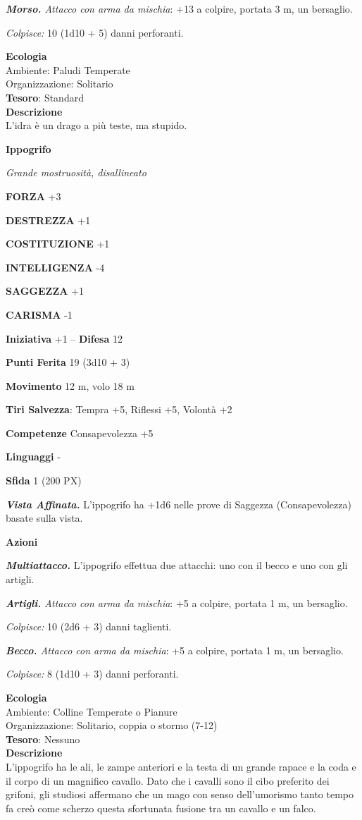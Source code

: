 \begin{multicols}{2}
\textit{\textbf{Morso.} Attacco con arma da mischia}: +13 a colpire, portata 3 m, un bersaglio.

\textit{Colpisce:} 10 (1d10 + 5) danni perforanti.

\textbf{Ecologia}\\
Ambiente: Paludi Temperate\\
Organizzazione: Solitario\\
\textbf{Tesoro}: Standard\\
\textbf{Descrizione}\\
L'idra è un drago a più teste, ma stupido.


\medskip{}\textbf{Ippogrifo}

\textit{Grande mostruosità, disallineato}

\textbf{FORZA} +3

\textbf{DESTREZZA} +1

\textbf{COSTITUZIONE} +1

\textbf{INTELLIGENZA} -4

\textbf{SAGGEZZA} +1

\textbf{CARISMA} -1

\textbf{Iniziativa} +1 -- \textbf{Difesa} 12

\textbf{Punti Ferita} 19 (3d10 + 3)

\textbf{Movimento} 12 m, volo 18 m

\textbf{Tiri Salvezza}: Tempra +5, Riflessi +5, Volontà +2

\textbf{Competenze} Consapevolezza +5

\textbf{Linguaggi} -

\textbf{Sfida} 1 (200 PX)

\textit{\textbf{Vista Affinata.}} L'ippogrifo ha +1d6 nelle prove di Saggezza (Consapevolezza) basate sulla vista.

\textbf{Azioni}

\textit{\textbf{Multiattacco.}} L'ippogrifo effettua due attacchi: uno con il becco e uno con gli artigli.

\textit{\textbf{Artigli.} Attacco con arma da mischia}: +5 a colpire, portata 1 m, un bersaglio.

\textit{Colpisce:} 10 (2d6 + 3) danni taglienti.

\textit{\textbf{Becco.} Attacco con arma da mischia}: +5 a colpire, portata 1 m, un bersaglio.

\textit{Colpisce:} 8 (1d10 + 3) danni perforanti.

\textbf{Ecologia}\\
Ambiente: Colline Temperate o Pianure\\
Organizzazione: Solitario, coppia o stormo (7-12)\\
\textbf{Tesoro}: Nessuno\\
\textbf{Descrizione}\\
L'ippogrifo ha le ali, le zampe anteriori e la testa di un grande rapace e la coda e il corpo di un magnifico cavallo. Dato che i cavalli sono il cibo preferito dei grifoni, gli studiosi affermano che un mago con senso dell'umorismo tanto tempo fa creò come scherzo questa sfortunata fusione tra un cavallo e un falco.


\end{multicols}
